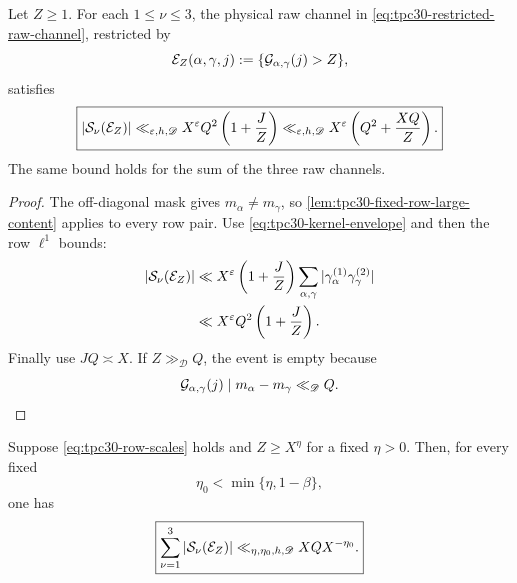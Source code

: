\begin{theorem}
\label{thm:tpc30-common-target-pruning}
Let $Z\ge1$.  For each $1\le\nu\le3$, the physical raw channel in
\eqref{eq:tpc30-restricted-raw-channel}, restricted by
\begin{equation}
 \mathcal E_Z(\alpha,\gamma,j)
 :=\{\mathcal G_{\alpha,\gamma}(j)>Z\},
 \label{eq:tpc30-large-target-content-event}
\end{equation}
satisfies
\begin{equation}
 \boxed{
 |\mathcal S_\nu(\mathcal E_Z)|
 \ll_{\varepsilon,h,\mathscr D}X^\varepsilon Q^2
 \left(1+\frac JZ\right)
 \ll_{\varepsilon,h,\mathscr D}X^\varepsilon
 \left(Q^2+\frac{XQ}{Z}\right).}
 \label{eq:tpc30-main-content-bound}
\end{equation}
The same bound holds for the sum of the three raw channels.
\end{theorem}

\begin{proof}
The off-diagonal mask gives $m_\alpha\ne m_\gamma$, so
\cref{lem:tpc30-fixed-row-large-content} applies to every row pair.
Use \eqref{eq:tpc30-kernel-envelope} and then the row $\ell^1$ bounds:
\begin{align*}
 |\mathcal S_\nu(\mathcal E_Z)|
 &\ll X^\varepsilon\left(1+\frac JZ\right)
 \sum_{\alpha,\gamma}
 |\gamma_\alpha^{(1)}\gamma_\gamma^{(2)}|\\
 &\ll X^\varepsilon Q^2\left(1+\frac JZ\right).
\end{align*}
Finally use $JQ\asymp X$.  If $Z\gg_{\mathscr D}Q$, the event is
empty because
\begin{equation}
 \mathcal G_{\alpha,\gamma}(j)
 \mid m_\alpha-m_\gamma
 \ll_{\mathscr D}Q.
 \label{eq:tpc30-content-upper-range}
\end{equation}
\end{proof}

\begin{corollary}
\label{cor:tpc30-content-power-saving}
Suppose \eqref{eq:tpc30-row-scales} holds and $Z\ge X^\eta$ for a
fixed $\eta>0$.  Then, for every fixed
\begin{equation}
 \eta_0<\min\{\eta,1-\beta\},
 \label{eq:tpc30-saving-exponent}
\end{equation}
one has
\begin{equation}
 \boxed{
 \sum_{\nu=1}^3|\mathcal S_\nu(\mathcal E_Z)|
 \ll_{\eta,\eta_0,h,\mathscr D}XQX^{-\eta_0}.}
 \label{eq:tpc30-content-power-saving}
\end{equation}
\end{corollary}

